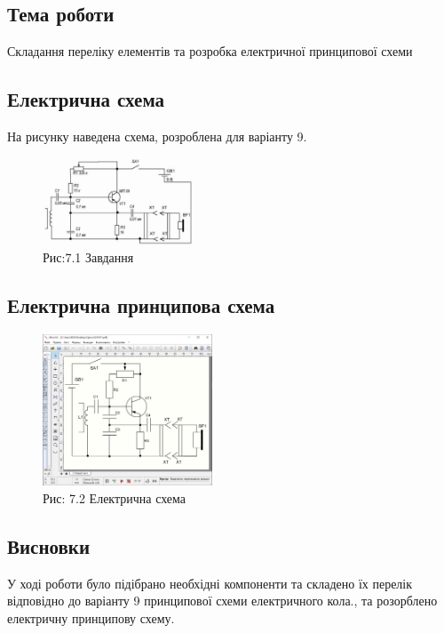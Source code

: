 \documentclass[a4paper]{article}
\begin{document}
\subsection*{Тема роботи}
Складання переліку елементів 
    та розробка електричної 
    принципової схеми
\subsection*{Електрична схема}
На рисунку наведена схема, розроблена для варіанту 9.

\begin{figure}[h]
    \centering
    \includegraphics[width=0.4\textwidth]{imgs/PW7.1.png}
    \caption*{Рис:7.1 Завдання}
\end{figure}

\subsection*{Електрична принципова схема}
\begin{figure}[h]
    \centering
    \includegraphics[width=0.45\textwidth]{imgs/PW7.2.png}
    \caption*{Рис: 7.2 Електрична схема}
\end{figure}

\subsection*{Висновки}
У ході роботи було підібрано необхідні компоненти та складено їх перелік відповідно до варіанту 9 принципової схеми електричного кола., та розорблено електричну принципову схему.
\end{document}
